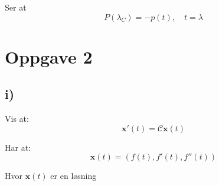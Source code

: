 \documentclass[a4paper, norsk, twoside, 10pt]{article}
\begin{document}
\begin{flushleft}
  Ser at \[P(\lambda_{C}) = -p(t), \quad t = \lambda\]


  \newpage

  \section*{Oppgave 2}

  \subsection*{i)}

  Vis at: \[\mathbf{x}'(t)  = \mathcal{C}\mathbf{x}(t)\]

  Har at:
  \[\mathbf{x}(t) = (f(t), f'(t), f''(t))\]

  Hvor $\mathbf{x}(t)$ er en løsning
  


  
\end{flushleft}
\end{document}
